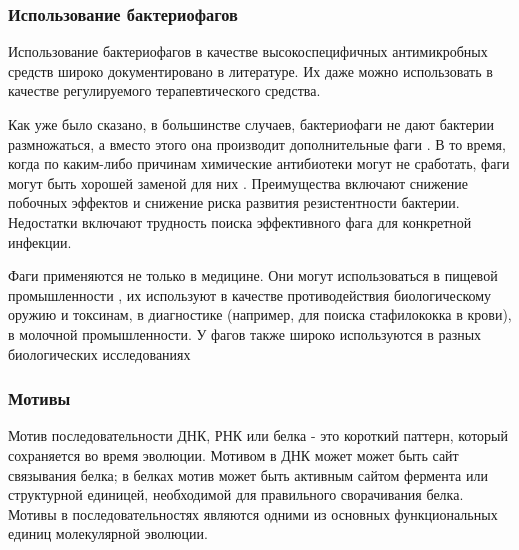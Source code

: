 \documentclass[14pt]{extarticle}
\begin{document}
    \begin{center}
    \item \subsubsection{Использование бактериофагов}
    \end{center}
    
    \par{Использование бактериофагов в качестве высокоспецифичных антимикробных средств широко документировано в 
    литературе. Их даже можно использовать в качестве регулируемого терапевтического средства. \cite{phagemed}}
    
    \par{Как уже было сказано, в большинстве случаев, бактериофаги не дают бактерии размножаться, а вместо этого она 
    производит дополнительные фаги \cite{phagetherapy}. В то время, когда по каким-либо причинам химические антибиотеки 
    могут не сработать, фаги могут быть хорошей заменой для них \cite{phageapps}. Преимущества включают снижение 
    побочных эффектов и снижение риска развития резистентности бактерии. Недостатки включают трудность поиска 
    эффективного фага для конкретной инфекции. \cite{advdisphage}}
    
    \par{Фаги применяются не только в медицине. Они могут использоваться в пищевой промышленности \cite{phagesalm}, их 
    используют в качестве противодействия биологическому оружию и токсинам, в диагностике (например, для поиска 
    стафилококка в крови), в молочной промышленности. У фагов также широко используются в разных биологических 
    исследованиях \cite{phagewikieng}}
    
    \begin{center}
    \item \subsubsection{Мотивы}
    \end{center}
    
    \par{Мотив последовательности ДНК, РНК или белка - это короткий паттерн, который сохраняется во время эволюции. 
    Мотивом в ДНК может может быть сайт связывания белка; в белках мотив может быть активным сайтом фермента или 
    структурной единицей, необходимой для правильного сворачивания белка. Мотивы в последовательностях являются одними 
    из основных функциональных единиц молекулярной эволюции.}
    
\end{document}
